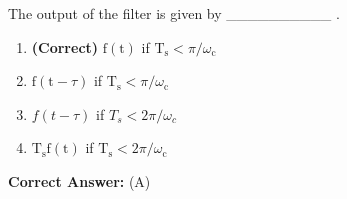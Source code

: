 \documentclass[11pt,a4paper]{article}
\begin{document}
The output of the filter is given by \_\_\_\_\_\_\_\_\_\_ .


\begin{enumerate}[label=(\Alph*)]
    \item \textbf{(Correct)} $\mathrm{f}(\mathrm{t})$ if $\mathrm{T}_{\mathrm{s}}<\pi / \omega_{\mathrm{c}}$
    \item $\mathrm{f}(\mathrm{t}-\tau)$ if $\mathrm{T}_{\mathrm{s}}<\pi / \omega_{\mathrm{c}}$
    \item $f(t-\tau)$ if $T_{s}<2 \pi / \omega_{c}$
    \item $\mathrm{T}_{\mathrm{s}} \mathrm{f}(\mathrm{t})$ if $\mathrm{T}_{\mathrm{s}}<2 \pi / \omega_{\mathrm{c}}$
\end{enumerate}

\noindent \textbf{Correct Answer:} (A)
\end{document}

